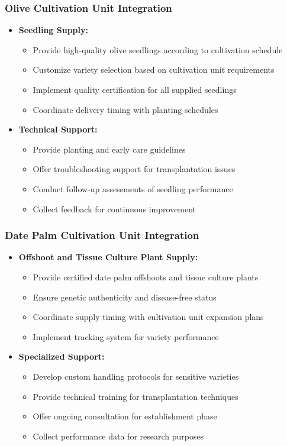 \subsubsection{Olive Cultivation Unit Integration}
\begin{itemize}
    \item \textbf{Seedling Supply:}
    \begin{itemize}
        \item Provide high-quality olive seedlings according to cultivation schedule
        \item Customize variety selection based on cultivation unit requirements
        \item Implement quality certification for all supplied seedlings
        \item Coordinate delivery timing with planting schedules
    \end{itemize}
    
    \item \textbf{Technical Support:}
    \begin{itemize}
        \item Provide planting and early care guidelines
        \item Offer troubleshooting support for transplantation issues
        \item Conduct follow-up assessments of seedling performance
        \item Collect feedback for continuous improvement
    \end{itemize}
\end{itemize}

\subsubsection{Date Palm Cultivation Unit Integration}
\begin{itemize}
    \item \textbf{Offshoot and Tissue Culture Plant Supply:}
    \begin{itemize}
        \item Provide certified date palm offshoots and tissue culture plants
        \item Ensure genetic authenticity and disease-free status
        \item Coordinate supply timing with cultivation unit expansion plans
        \item Implement tracking system for variety performance
    \end{itemize}
    
    \item \textbf{Specialized Support:}
    \begin{itemize}
        \item Develop custom handling protocols for sensitive varieties
        \item Provide technical training for transplantation techniques
        \item Offer ongoing consultation for establishment phase
        \item Collect performance data for research purposes
    \end{itemize}
\end{itemize}

